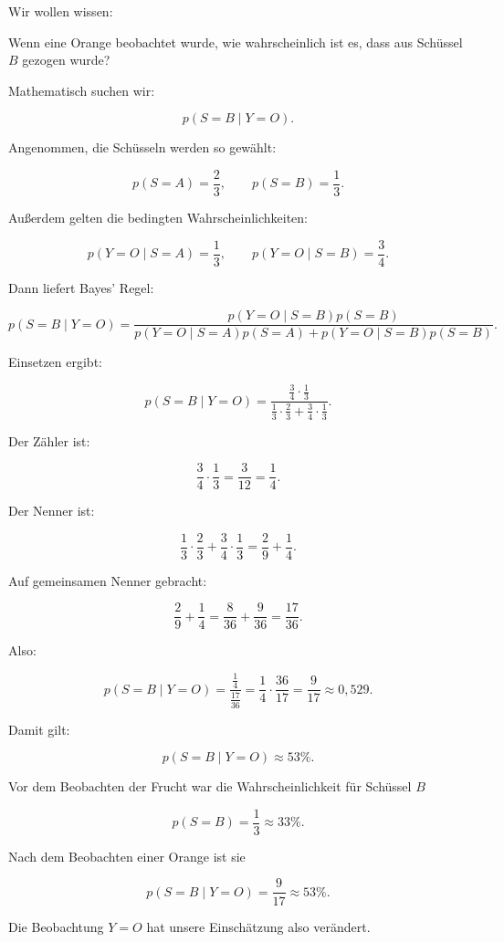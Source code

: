 Wir wollen wissen:

\begin{center}
Wenn eine Orange beobachtet wurde, wie wahrscheinlich ist es, dass aus Schüssel \(B\) gezogen wurde?
\end{center}

Mathematisch suchen wir:

\[
    p(S=B \mid Y=O).
\]

Angenommen, die Schüsseln werden so gewählt:

\[
    p(S=A) = \frac{2}{3},
    \qquad
    p(S=B) = \frac{1}{3}.
\]

Außerdem gelten die bedingten Wahrscheinlichkeiten:

\[
    p(Y=O \mid S=A) = \frac{1}{3},
    \qquad
    p(Y=O \mid S=B) = \frac{3}{4}.
\]

Dann liefert Bayes' Regel:

\[
    p(S=B \mid Y=O)
    =
    \frac{
        p(Y=O \mid S=B)p(S=B)
    }{
        p(Y=O \mid S=A)p(S=A)
        +
        p(Y=O \mid S=B)p(S=B)
    }.
\]

Einsetzen ergibt:

\[
    p(S=B \mid Y=O)
    =
    \frac{
        \frac{3}{4}\cdot\frac{1}{3}
    }{
        \frac{1}{3}\cdot\frac{2}{3}
        +
        \frac{3}{4}\cdot\frac{1}{3}
    }.
\]

Der Zähler ist:

\[
    \frac{3}{4}\cdot\frac{1}{3}
    =
    \frac{3}{12}
    =
    \frac{1}{4}.
\]

Der Nenner ist:

\[
    \frac{1}{3}\cdot\frac{2}{3}
    +
    \frac{3}{4}\cdot\frac{1}{3}
    =
    \frac{2}{9}
    +
    \frac{1}{4}.
\]

Auf gemeinsamen Nenner gebracht:

\[
    \frac{2}{9}
    +
    \frac{1}{4}
    =
    \frac{8}{36}
    +
    \frac{9}{36}
    =
    \frac{17}{36}.
\]

Also:

\[
    p(S=B \mid Y=O)
    =
    \frac{
        \frac{1}{4}
    }{
        \frac{17}{36}
    }
    =
    \frac{1}{4}
    \cdot
    \frac{36}{17}
    =
    \frac{9}{17}
    \approx
    0{,}529.
\]

Damit gilt:

\[
    p(S=B \mid Y=O)
    \approx
    53\%.
\]

\begin{examplebox}
Vor dem Beobachten der Frucht war die Wahrscheinlichkeit für Schüssel \(B\)

\[
    p(S=B) = \frac{1}{3} \approx 33\%.
\]

Nach dem Beobachten einer Orange ist sie

\[
    p(S=B \mid Y=O) = \frac{9}{17} \approx 53\%.
\]

Die Beobachtung \(Y=O\) hat unsere Einschätzung also verändert.
\end{examplebox}

